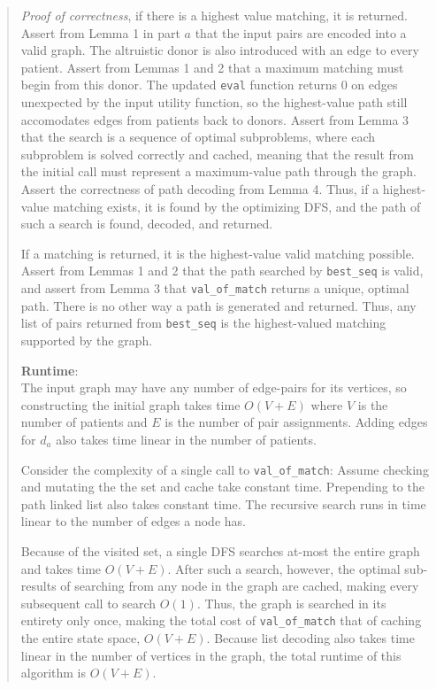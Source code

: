 \documentclass[11pt]{article}
\begin{document}
\begin{enumerate}
\begin{enumerate}
\begin{quote}
      \medskip
      \textit{Proof of correctness}, if there is a highest value matching, it is returned. Assert from Lemma 1 in part $a$ that the input pairs are encoded into a valid graph. The altruistic donor is also introduced with an edge to every patient. Assert from Lemmas 1 and 2 that a maximum matching must begin from this donor. The updated \texttt{eval} function returns $0$ on edges unexpected by the input utility function, so the highest-value path still accomodates edges from patients back to donors. Assert from Lemma 3 that the search is a sequence of optimal subproblems, where each subproblem is solved correctly and cached, meaning that the result from the initial call must represent a maximum-value path through the graph. Assert the correctness of path decoding from Lemma 4. Thus, if a highest-value matching exists, it is found by the optimizing DFS, and the path of such a search is found, decoded, and returned. 
      
      \medskip
      If a matching is returned, it is the highest-value valid matching possible. Assert from Lemmas 1 and 2 that the path searched by \texttt{best\_seq} is valid, and assert from Lemma 3 that \texttt{val\_of\_match} returns a unique, optimal path. There is no other way a path is generated and returned. Thus, any list of pairs returned from \texttt{best\_seq} is the highest-valued matching supported by the graph.

      \medskip
      \textbf{Runtime}: \\ 
      The input graph may have any number of edge-pairs for its vertices, so constructing the initial graph takes time $O(V + E)$ where $V$ is the number of patients and $E$ is the number of pair assignments. Adding edges for $d_a$ also takes time linear in the number of patients. 

      \medskip
      Consider the complexity of a single call to \texttt{val\_of\_match}: Assume checking and mutating the the set and cache take constant time. Prepending to the path linked list also takes constant time. The recursive search runs in time linear to the number of edges a node has. 

      \medskip
      Because of the visited set, a single DFS searches at-most the entire graph and takes time $O(V + E)$. After such a search, however, the optimal sub-results of searching from any node in the graph are cached, making every subsequent call to search $O(1)$. Thus, the graph is searched in its entirety only once, making the total cost of \texttt{val\_of\_match} that of caching the entire state space, $O(V  + E)$. Because list decoding also takes time linear in the number of vertices in the graph, the total runtime of this algorithm is $O(V + E)$.
      \end{quote}
\end{enumerate}
    


\end{enumerate}
\end{document}
